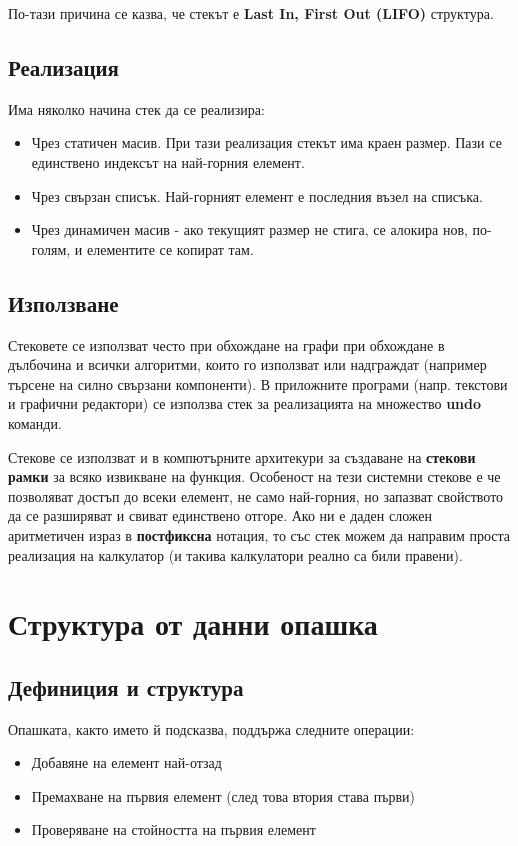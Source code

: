 \documentclass[fleqn,12pt]{article}
\begin{document}
По-тази причина се казва, че стекът е \textbf{Last In, First Out (LIFO)} структура.

\subsection{Реализация}
Има няколко начина стек да се реализира:
\begin{itemize}
    \item Чрез статичен масив. При тази реализация стекът има краен размер. Пази се единствено индексът на най-горния елемент. 
    \item Чрез свързан списък. Най-горният елемент е последния възел на списъка.
    \item Чрез динамичен масив - ако текущият размер не стига, се алокира нов, по-голям, и елементите се копират там.
\end{itemize}

\subsection{Използване}
Стековете се използват често при обхождане на графи при обхождане в дълбочина и всички алгоритми, които го използват или надграждат
(например търсене на силно свързани компоненти). В приложните програми (напр. текстови и графични редактори) се използва стек за 
реализацията на множество \textbf{undo} команди.

Стекове се използват и в компютърните архитекури за създаване на \textbf{стекови рамки} за всяко извикване на функция. Особеност на 
тези системни стекове е че позволяват достъп до всеки елемент, не само най-горния, но запазват свойството да се разширяват и свиват
единствено отгоре. Ако ни е даден сложен аритметичен израз в \textbf{постфиксна} нотация, то със стек можем да направим проста реализация на калкулатор
(и такива калкулатори реално са били правени).

\section{Структура от данни опашка}
\subsection{Дефиниция и структура}
Опашката, както името й подсказва, поддържа следните операции:
\begin{itemize}
    \item Добавяне на елемент най-отзад
    \item Премахване на първия елемент (след това втория става първи)
    \item Проверяване на стойността на първия елемент
\end{itemize}
\end{document}
